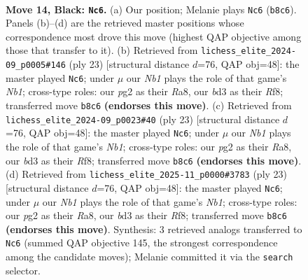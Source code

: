 \documentclass[11pt]{article}
\begin{document}
\begin{figure}[p]
\label{fig:thought-m25}
\end{figure}

\clearpage

\begin{figure}[p]\centering
\begin{subfigure}{0.46\textwidth}\centering
\resizebox{\linewidth}{!}{%
\newchessgame
\chessboard[
  setfen={rn4k1/pp2rppp/3bbq2/3p4/3N4/N2B4/PPP2PPP/R2QR1K1 b - - 2 14},
  showmover=false,
  pgfstyle=straightmove, color=movearrow, markmove={b8-c6}
]}
\caption{}
\end{subfigure}\hfill
\begin{subfigure}{0.46\textwidth}\centering
\resizebox{\linewidth}{!}{%
\newchessgame
\chessboard[
  setfen={rn3rk1/pp1b1pp1/4pq1p/8/1bBN4/1QN1P3/PP3PPP/2R2RK1 b - - 2 12},
  showmover=false,
  pgfstyle=straightmove, color=movearrow, markmove={b8-c6}
]}
\caption{}
\end{subfigure}
\\[4pt]
\begin{subfigure}{0.46\textwidth}\centering
\resizebox{\linewidth}{!}{%
\newchessgame
\chessboard[
  setfen={rn3rk1/pp1b1pp1/4pq1p/8/1bBN4/1QN1P3/PP3PPP/2R2RK1 b - - 2 12},
  showmover=false,
  pgfstyle=straightmove, color=movearrow, markmove={b8-c6}
]}
\caption{}
\end{subfigure}\hfill
\begin{subfigure}{0.46\textwidth}\centering
\resizebox{\linewidth}{!}{%
\newchessgame
\chessboard[
  setfen={rn3rk1/pp1b1pp1/4pq1p/8/1bBN4/1QN1P3/PP3PPP/2R2RK1 b - - 2 12},
  showmover=false,
  pgfstyle=straightmove, color=movearrow, markmove={b8-c6}
]}
\caption{}
\end{subfigure}
\caption{\textbf{Move 14, Black: \texttt{Nc6}.} (a) Our position; Melanie plays \texttt{Nc6} (\texttt{b8c6}). Panels (b)--(d) are the retrieved master positions whose correspondence most drove this move (highest QAP objective among those that transfer to it). (b) Retrieved from \texttt{lichess\_elite\_2024-09\_p0005\#146} (ply 23) [structural distance $d$=76, QAP obj=48]: the master played \texttt{Nc6}; under $\mu$ our \emph{Nb1} plays the role of that game's \emph{Nb1}; cross-type roles: our \emph{p}g2 as their \emph{R}a8, our \emph{b}d3 as their \emph{R}f8; transferred move \texttt{b8c6} \textbf{(endorses this move)}. (c) Retrieved from \texttt{lichess\_elite\_2024-09\_p0023\#40} (ply 23) [structural distance $d$=76, QAP obj=48]: the master played \texttt{Nc6}; under $\mu$ our \emph{Nb1} plays the role of that game's \emph{Nb1}; cross-type roles: our \emph{p}g2 as their \emph{R}a8, our \emph{b}d3 as their \emph{R}f8; transferred move \texttt{b8c6} \textbf{(endorses this move)}. (d) Retrieved from \texttt{lichess\_elite\_2025-11\_p0000\#3783} (ply 23) [structural distance $d$=76, QAP obj=48]: the master played \texttt{Nc6}; under $\mu$ our \emph{Nb1} plays the role of that game's \emph{Nb1}; cross-type roles: our \emph{p}g2 as their \emph{R}a8, our \emph{b}d3 as their \emph{R}f8; transferred move \texttt{b8c6} \textbf{(endorses this move)}. Synthesis: 3 retrieved analogs transferred to \texttt{Nc6} (summed QAP objective 145, the strongest correspondence among the candidate moves); Melanie committed it via the \texttt{search} selector.}

\end{figure}
\end{document}
